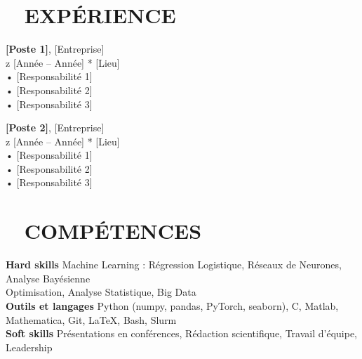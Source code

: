 \documentclass[a4paper,10pt]{article}
\begin{document}
\vspace{0.3cm}

\section*{\textcolor{accent}{\faBriefcase} ~ \textcolor{heading}{EXPÉRIENCE}}
\textbf{\textcolor{heading}{[Poste 1]}}, \textcolor{body}{[Entreprise]} \\
\textcolor{body}{z [Année – Année] * [Lieu]} \\
\textcolor{body}{• [Responsabilité 1]} \\
\textcolor{body}{• [Responsabilité 2]} \\
\textcolor{body}{• [Responsabilité 3]} \\

\vspace{0.3cm}

\textbf{\textcolor{heading}{[Poste 2]}}, \textcolor{body}{[Entreprise]} \\
\textcolor{body}{z [Année – Année] * [Lieu]} \\
\textcolor{body}{• [Responsabilité 1]} \\
\textcolor{body}{• [Responsabilité 2]} \\
\textcolor{body}{• [Responsabilité 3]} \\

\vspace{0.3cm}

\section*{\textcolor{accent}{\faCogs} ~ \textcolor{heading}{COMPÉTENCES}}
\textbf{\textcolor{heading}{Hard skills}}  
\textcolor{body}{Machine Learning : Régression Logistique, Réseaux de Neurones, Analyse Bayésienne} \\
\textcolor{body}{Optimisation, Analyse Statistique, Big Data} \\

\textbf{\textcolor{heading}{Outils et langages}}  
\textcolor{body}{Python (numpy, pandas, PyTorch, seaborn), C, Matlab, Mathematica, Git, LaTeX, Bash, Slurm} \\

\textbf{\textcolor{heading}{Soft skills}}  
\textcolor{body}{Présentations en conférences, Rédaction scientifique, Travail d’équipe, Leadership} \\

\vspace{0.3cm}
\end{document}
